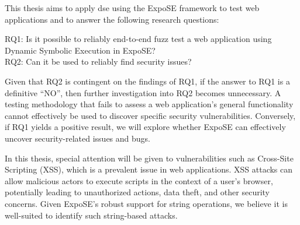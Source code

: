This thesis aims to apply \gls{dse} using the ExpoSE framework to test web applications and to answer the following research questions:

RQ1: Is it possible to reliably end-to-end fuzz test a web application using Dynamic Symbolic Execution in ExpoSE?\\
RQ2: Can it be used to reliably find security issues?

Given that RQ2 is contingent on the findings of RQ1, if the answer to RQ1 is a definitive “NO”, then further investigation into RQ2 becomes unnecessary. A testing methodology that fails to assess a web application's general functionality cannot effectively be used to discover specific security vulnerabilities. Conversely, if RQ1 yields a positive result, we will explore whether ExpoSE can effectively uncover security-related issues and bugs.

In this thesis, special attention will be given to vulnerabilities such as Cross-Site Scripting (XSS), which is a prevalent issue in web applications. XSS attacks can allow malicious actors to execute scripts in the context of a user's browser, potentially leading to unauthorized actions, data theft, and other security concerns. Given ExpoSE's robust support for string operations, we believe it is well-suited to identify such string-based attacks.